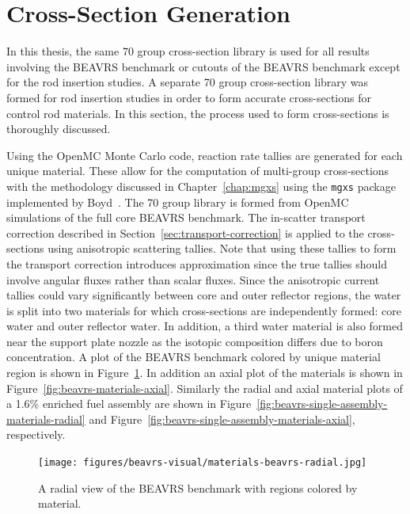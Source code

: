 \section{Cross-Section Generation}
\label{sec:beavrs-xs-gen}

In this thesis, the same 70 group cross-section library is used for all results involving the BEAVRS benchmark or cutouts of the BEAVRS benchmark except for the rod insertion studies. A separate 70 group cross-section library was formed for rod insertion studies in order to form accurate cross-sections for control rod materials. In this section, the process used to form cross-sections is thoroughly discussed.

Using the OpenMC Monte Carlo code, reaction rate tallies are generated for each unique material. These allow for the computation of multi-group cross-sections with the methodology discussed in Chapter~\ref{chap:mgxs} using the \texttt{mgxs} package implemented by Boyd~\cite{boyd2017thesis}. The 70 group library is formed from OpenMC simulations of the full core BEAVRS benchmark. The in-scatter transport correction described in Section~\ref{sec:transport-correction} is applied to the cross-sections using anisotropic scattering tallies. Note that using these tallies to form the transport correction introduces approximation since the true tallies should involve angular fluxes rather than scalar fluxes. Since the anisotropic current tallies could vary significantly between core and outer reflector regions, the water is split into two materials for which cross-sections are independently formed: core water and outer reflector water. In addition, a third water material is also formed near the support plate nozzle as the isotopic composition differs due to boron concentration. A plot of the BEAVRS benchmark colored by unique material region is shown in Figure~\ref{fig:beavrs-materials-radial}. In addition an axial plot of the materials is shown in Figure~\ref{fig:beavrs-materials-axial}. Similarly the radial and axial material plots of a 1.6\% enriched fuel assembly are shown in Figure~\ref{fig:beavrs-single-assembly-materials-radial} and Figure~\ref{fig:beavrs-single-assembly-materials-axial}, respectively.


\begin{figure}[h!]
	\centering
	\texttt{[image: figures/beavrs-visual/materials-beavrs-radial.jpg]}
	\caption{A radial view of the BEAVRS benchmark with regions colored by material.}
	\label{fig:beavrs-materials-radial}
\end{figure} 


